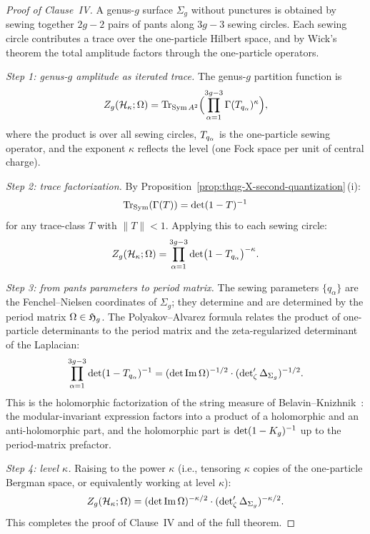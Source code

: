 \begin{proof}[Proof of Clause~IV]
A genus-$g$ surface $\Sigma_g$ without punctures is obtained by
sewing together $2g-2$ pairs of pants along $3g-3$ sewing circles.
Each sewing circle contributes a trace over the one-particle
Hilbert space, and by Wick's theorem the total amplitude factors
through the one-particle operators.

\emph{Step 1: genus-$g$ amplitude as iterated trace.}
The genus-$g$ partition function is
\begin{equation}%
Z_g(\cH_\kappa; \Omega)
= \operatorname{Tr}_{\operatorname{Sym} A^2}
\Bigl(\prod_{\alpha=1}^{3g-3}
\secquant(\sewop_{q_\alpha})^{\kappa}\Bigr),
\end{equation}
where the product is over all sewing circles, $T_{q_\alpha}$
is the one-particle sewing operator, and the exponent $\kappa$
reflects the level (one Fock space per unit of central charge).

\emph{Step 2: trace factorization.}
By Proposition~\ref{prop:thqg-X-second-quantization}\,(i):
\[
\operatorname{Tr}_{\operatorname{Sym}}(\Gamma(T))
= \det(1 - T)^{-1}
\]
for any trace-class $T$ with $\|T\| < 1$. Applying this to each
sewing circle:
\begin{equation}%
Z_g(\cH_\kappa; \Omega)
= \prod_{\alpha=1}^{3g-3}
\det\bigl(1 - \sewop_{q_\alpha}\bigr)^{-\kappa}.
\end{equation}

\emph{Step 3: from pants parameters to period matrix.}
The sewing parameters $\{q_\alpha\}$ are the Fenchel--Nielsen
coordinates of $\Sigma_g$; they determine and are determined by
the period matrix $\Omega \in \mathfrak{H}_g$. The Polyakov--Alvarez
formula \cite{BK86} relates the product of one-particle
determinants to the period matrix and the zeta-regularized
determinant of the Laplacian:
\begin{equation}%
\prod_{\alpha=1}^{3g-3}
\det(1 - \sewop_{q_\alpha})^{-1}
= (\det\operatorname{Im}\Omega)^{-1/2}
\cdot (\zetareg\Delta_{\Sigma_g})^{-1/2}.
\end{equation}
This is the holomorphic factorization of the string measure
of Belavin--Knizhnik~\cite{BK86}: the modular-invariant
expression factors into a product of a holomorphic and an
anti-holomorphic part, and the holomorphic part is
$\det(1 - K_g)^{-1}$ up to the period-matrix prefactor.

\emph{Step 4: level $\kappa$.}
Raising to the power $\kappa$ (i.e., tensoring $\kappa$ copies
of the one-particle Bergman space, or equivalently working at
level $\kappa$):
\begin{equation}%
Z_g(\cH_\kappa; \Omega)
= (\det\operatorname{Im}\Omega)^{-\kappa/2}
\cdot (\zetareg\Delta_{\Sigma_g})^{-\kappa/2}.
\end{equation}
This completes the proof of Clause~IV and of the full theorem.
\end{proof}

